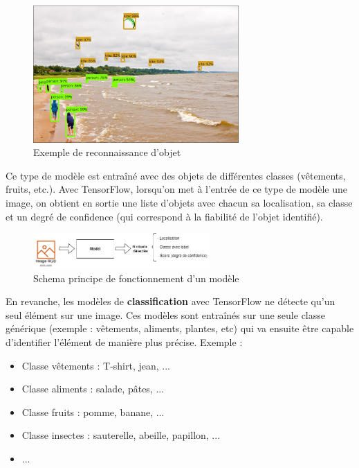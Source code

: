 \documentclass[UTF8]{EPURapport}
\begin{document}
\begin{figure}[h!]
\centering
  \includegraphics[width=0.7\textwidth]{images/object_detection.jpg}
  \caption{Exemple de reconnaissance d'objet}
  \label{fig:objectdetection}
\end{figure}

 Ce type de modèle est entraîné avec des objets de différentes classes (vêtements, fruits, etc.). Avec TensorFlow, lorsqu'on met à l'entrée de ce type de modèle une image, on obtient en sortie une liste d'objets avec chacun sa localisation, sa classe et un degré de confidence (qui correspond à la fiabilité de l'objet identifié).

\begin{figure}[h!]
\centering
  \includegraphics[width=0.6\textwidth]{images/schema_objectDetection.png}
  \caption{Schema principe de fonctionnement d'un modèle}
  \label{fig:schema_objectdetection}
\end{figure}

En revanche, les modèles de \textbf{classification} avec TensorFlow ne détecte qu'un seul élément sur une image. Ces modèles sont entraînés sur une seule classe générique (exemple : vêtements, aliments, plantes, etc) qui va ensuite être capable d'identifier l'élément de manière plus précise. Exemple : \\

\begin{itemize}
  \item Classe vêtements : T-shirt, jean, ...
  \item Classe aliments : salade, pâtes, ...
  \item Classe fruits : pomme, banane, ...  
  \item Classe insectes : sauterelle, abeille, papillon, ...
  \item  ...
\end{itemize}
\end{document}

